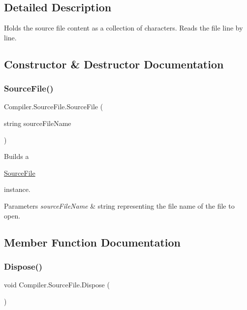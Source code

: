 \subsection{Detailed Description}
Holds the source file content as a collection of characters. Reads the file line by line. 

\subsection{Constructor \& Destructor Documentation}
\mbox{\label{class_compiler_1_1_source_file_aba8bb7d1c0418d2b0c6033308209265a}} 
\subsubsection{\texorpdfstring{Source\+File()}{SourceFile()}}
{\footnotesize\ttfamily Compiler.\+Source\+File.\+Source\+File (\begin{DoxyParamCaption}\item[{string}]{source\+File\+Name }\end{DoxyParamCaption})}

Builds a
\begin{DoxyCode}
\mbox{\hyperlink{class_compiler_1_1_source_file_aba8bb7d1c0418d2b0c6033308209265a}{SourceFile}} 
\end{DoxyCode}
 instance. 
\begin{DoxyParams}{Parameters}
{\em source\+File\+Name} & string representing the file name of the file to open. \\
\hline
\end{DoxyParams}


\subsection{Member Function Documentation}
\mbox{\label{class_compiler_1_1_source_file_af5331d15e3c1a629af9cbd273c36c02c}} 
\subsubsection{\texorpdfstring{Dispose()}{Dispose()}\hspace{0.1cm}{\footnotesize\ttfamily [1/2]}}
{\footnotesize\ttfamily void Compiler.\+Source\+File.\+Dispose (\begin{DoxyParamCaption}{ }\end{DoxyParamCaption})}

